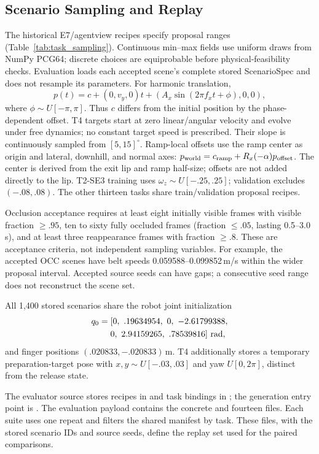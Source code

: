\subsection{Scenario Sampling and Replay}

The historical E7/agentview recipes specify proposal ranges
(Table~\ref{tab:task_sampling}). Continuous min--max fields use uniform draws
from NumPy PCG64; discrete choices are equiprobable before physical-feasibility
checks. Evaluation loads each accepted scene's complete stored ScenarioSpec
and does not resample its parameters.
For harmonic translation,
\[
p(t)=c+(0,v_y,0)t+(A_x\sin(2\pi f_xt+\phi),0,0),
\]
where $\phi\sim U[-\pi,\pi]$. Thus $c$ differs from the initial position by
the phase-dependent offset. T4 targets start at zero linear/angular velocity
and evolve under free dynamics; no constant target speed is prescribed.
Their slope is continuously sampled from $[5,15]^\circ$.
Ramp-local offsets use the ramp center as origin and lateral, downhill,
and normal axes: $p_{\rm world}=c_{\rm ramp}+R_x(-\alpha)p_{\rm offset}$.
The center is derived from the exit lip and ramp half-size; offsets are
not added directly to the lip.
T2-SE3 training uses $\omega_z\sim U[-.25,.25]$; validation excludes
$(-.08,.08)$. The other thirteen tasks share train/validation proposal recipes.

Occlusion acceptance requires at least eight initially visible frames with
visible fraction $\geq.95$, ten to sixty fully occluded frames
(fraction $\leq.05$, lasting 0.5--3.0\,s), and at least three reappearance
frames with fraction $\geq.8$. These are acceptance criteria, not independent
sampling variables. For example, the accepted OCC scenes have belt speeds
0.059588--0.099852\,m/s within the wider proposal interval.
Accepted source seeds can have gaps; a consecutive seed range does not
reconstruct the scene set.

All 1,400 stored scenarios share the robot joint initialization
\[
\begin{aligned}
q_0={}&[0,\ .19634954,\ 0,\ -2.61799388,\\
      &0,\ 2.94159265,\ .78539816]\ {\rm rad},
\end{aligned}
\]
and finger positions $(.020833,-.020833)$\,m.
T4 additionally stores a temporary preparation-target pose with
$x,y\sim U[-.03,.03]$ and yaw $U[0,2\pi]$, distinct from the release state.

The evaluator source stores recipes in 
and task bindings in ; the generation entry point is
.
The evaluation payload contains the concrete
 and fourteen
 files.
Each suite uses one repeat and filters the shared manifest by task.
These files, with the stored scenario IDs and source seeds, define the
replay set used for the paired comparisons.

